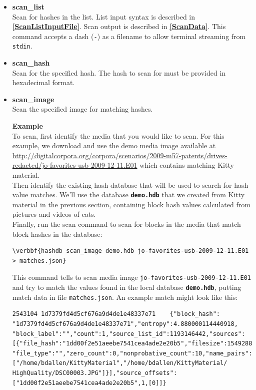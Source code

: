 \documentclass[11pt,fleqn]{article} %
\begin{document}
\begin{itemize}
\item \textbf{scan\_list}\\
Scan for hashes in the list. List input syntax is described in \textbf{\autoref{ScanListInputFile}}. Scan output is described in \textbf{\autoref{ScanData}}. This command accepts a dash (\verb+-+) as a filename to allow terminal streaming from \verb+stdin+.\\
\item \textbf{scan\_hash}\\
Scan for the specified hash. The hash to scan for must be provided in hexadecimal format.
\item \textbf{scan\_image}\\
Scan the specified image for matching hashes.

\textbf{Example}\\
To scan, first identify the media that you would like to scan. For this example, we download and use the demo media image available at \url{ http://digitalcorpora.org/corpora/scenarios/2009-m57-patents/drives-redacted/jo-favorites-usb-2009-12-11.E01} which contains matching Kitty material.\\

Then identify the existing hash database that will be used to search for hash value matches. We'll use the database \texttt{\textbf{demo.hdb}} that we created from Kitty material in the previous section, containing block hash values calculated from pictures and videos of cats.\\

Finally, run the \hdb scan command to scan for blocks in the media that match block hashes in the database:
\begin{Verbatim}[commandchars=\\\{\}]
\verbbf{hashdb scan_image demo.hdb jo-favorites-usb-2009-12-11.E01 > matches.json}
\end{Verbatim}
This command tells \hdb to scan media image \verb+jo-favorites-usb-2009-12-11.E01+ and try to match the values found in the local database \texttt{\textbf{demo.hdb}}, putting match data in file \verb+matches.json+.  An example match might look like this:

\begingroup
\footnotesize
\begin{Verbatim}[fontfamily=courier]
2543104	1d7379fd4d5cf676a9d4de1e48337e71	{"block_hash":
"1d7379fd4d5cf676a9d4de1e48337e71","entropy":4.880000114440918,
"block_label":"","count":1,"source_list_id":1193146442,"sources":
[{"file_hash":"1dd00f2e51aeebe7541cea4ade2e20b5","filesize":1549288,
"file_type":"","zero_count":0,"nonprobative_count":10,"name_pairs":
["/home/bdallen/KittyMaterial","/home/bdallen/KittyMaterial/
HighQuality/DSC00003.JPG"]}],"source_offsets":
["1dd00f2e51aeebe7541cea4ade2e20b5",1,[0]]}
\end{Verbatim}
\endgroup


\end{itemize}
\end{document}
